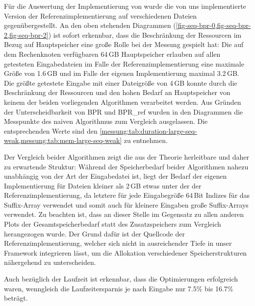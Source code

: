 Für die Auswertung der Implementierung von \bpr wurde die von uns implementierte Version der Referenzimplementierung auf verschiedenen Dateien gegenübergestellt.
An den oben stehenden Diagrammen (\cref{fig-seq-bpr-0,fig-seq-bpr-2,fig-seq-bpr-2}) ist sofort erkennbar, dass die Beschränkung der Ressourcen im Bezug auf Hauptspeicher eine große Rolle bei der Messung gespielt hat:
Die auf dem Rechenknoten verfügbaren 64\,GB Hauptspeicher erlauben auf allen getesteten Eingabedateien im Falle der Referenzimplementierung eine maximale Größe von 1.6\,GB und im Falle der eigenen Implementierung maximal 3.2\,GB.
Die größte getestete Eingabe mit einer Dateigröße von 4\,GB konnte durch die Beschränkung der Ressourcen und den hohen Bedarf an Hauptspeicher von keinem der beiden vorliegenden Algorithmen verarbeitet werden.
Aus Gründen der Unterscheidbarkeit von BPR und BPR\_ref wurden in den Diagrammen die Messpunkte des naiven Algorithmus zum Vergleich ausgelassen.
Die entsprechenden Werte sind den \cref{messung:tab:duration-large-seq-weak,messung:tab:mem-large-seq-weak} zu entnehmen.\par
Der Vergleich beider Algorithmen zeigt die aus der Theorie herleitbare und daher zu erwartende Struktur:
Während der Speicherbedarf beider Algorithmen nahezu unabhängig von der Art der Eingabedatei ist, liegt der Bedarf der eigenen Implementierung für Dateien kleiner als 2\,GB etwas unter der der Referenzimplementierung, da letztere für jede Eingabegröße 64\,Bit Indizes für das Suffix-Array verwendet und somit auch für kleinere Eingaben große Suffix-Arrays verwendet.
Zu beachten ist, dass an dieser Stelle im Gegensatz zu allen anderen Plots der Gesamtspeicherbedarf statt des Zusatzspeichers zum Vergleich herangezogen wurde.
Der Grund dafür ist der Quellcode der Referenzimplementierung, welcher sich nicht in ausreichender Tiefe in unser Framework integrieren lässt, um die Allokation verschiedener Speicherstrukturen nähergehend zu unterscheiden.\par
Auch bezüglich der Laufzeit ist erkennbar, dass die Optimierungen erfolgreich waren, wenngleich die Laufzeitersparnis je nach Eingabe nur 7.5\% bis 16.7\% beträgt.
